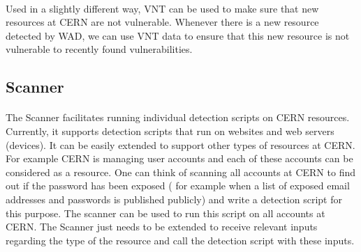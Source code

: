 \paragraph{}
Used in a slightly different way, VNT can be used to make sure that new resources at CERN are not vulnerable. Whenever there is a new resource detected by WAD, we can use VNT data to ensure that this new resource is not vulnerable to recently found vulnerabilities.
\subsection{Scanner}
\paragraph{}
The Scanner facilitates running individual detection scripts on CERN resources. Currently, it supports detection scripts that run on websites and web servers (devices). It can be easily extended to support other types of resources at CERN. For example CERN is managing user accounts and each of these accounts can be considered as a resource. One can think of scanning all accounts at CERN to find out if the password has been exposed ( for example when a list of exposed email addresses and passwords is published publicly) and write a detection script for this purpose. The scanner can be used to run this script on all accounts at CERN. The Scanner just needs to be extended to receive relevant inputs regarding the type of the resource and call the detection script with these inputs.
\\